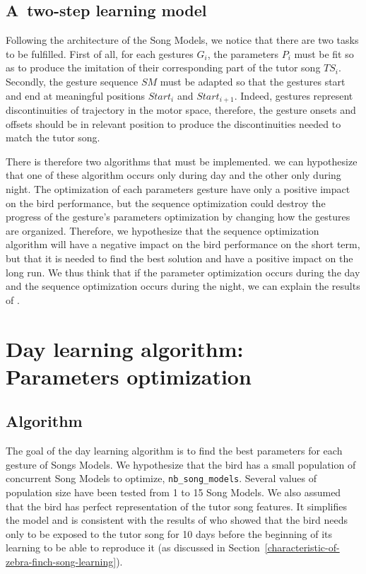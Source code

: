 \documentclass{report}
\begin{document}
\subsection{A two-step learning model} \label{two-step-learning-model}

Following the architecture of the Song Models, we notice that there are two
tasks to be fulfilled. First of all, for each gestures $G_i$, the parameters
$P_i$ must be fit so as to produce the imitation of their corresponding part
of the tutor song $TS_i$. Secondly, the gesture sequence $SM$ must be adapted so
that the gestures start and end at meaningful positions $Start_i$ and
$Start_{i+1}$. Indeed, gestures represent discontinuities of trajectory in the
motor space, therefore, the gesture onsets and offsets should be in relevant
position to produce the discontinuities needed to match the tutor song.


There is therefore two algorithms that must be implemented. we can hypothesize
that one of these algorithm occurs only during day and the other only during
night. The optimization of each parameters gesture have only a positive impact
on the bird performance, but the sequence optimization could destroy the
progress of the gesture's parameters optimization by changing how the gestures
are organized. Therefore, we hypothesize that the sequence optimization
algorithm will have a negative impact on the bird performance on the short term,
but that it is needed to find the best solution and have a positive impact on
the long run. We thus think that if the parameter optimization occurs during the
day and the sequence optimization occurs during the night, we can explain the
results of \textcite{deregnaucourt_how_2005}.



\section{Day learning algorithm: Parameters
optimization}\label{day-learning-algorithm}

\subsection{Algorithm}

The goal of the day learning algorithm is to find the best parameters for each
gesture of Songs Models. We hypothesize that the bird has a small population of
concurrent Song Models to optimize, \texttt{nb\_song\_models}. Several values of
population size have been tested from 1 to 15 Song Models. We also assumed that
the bird has perfect representation of the tutor song features. It simplifies
the model and is consistent with the results of \textcite{roper_onset_2006} who
showed that the bird needs only to be exposed to the tutor song for 10 days
before the beginning of its learning to be able to reproduce it (as discussed in
Section~\ref{characteristic-of-zebra-finch-song-learning}).
\end{document}
